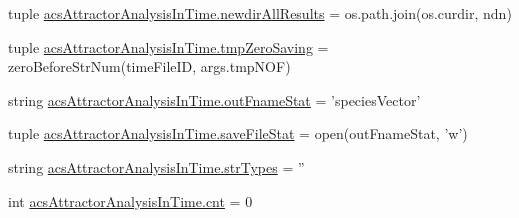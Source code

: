 \begin{DoxyCompactItemize}
tuple \hyperlink{a00125_aaf0f6fcbaaf97dcff16b62e86df0209c}{acs\+Attractor\+Analysis\+In\+Time.\+newdir\+All\+Results} = os.\+path.\+join(os.\+curdir, ndn)
\item 
tuple \hyperlink{a00125_ae86fc9dc3283934244ec28446445f722}{acs\+Attractor\+Analysis\+In\+Time.\+tmp\+Zero\+Saving} = zero\+Before\+Str\+Num(time\+File\+I\+D, args.\+tmp\+N\+O\+F)
\item 
string \hyperlink{a00125_a05e902a00f3333a303563029c80605de}{acs\+Attractor\+Analysis\+In\+Time.\+out\+Fname\+Stat} = 'species\+Vector'
\item 
tuple \hyperlink{a00125_a372b8cd0e4d3200958e9c61e3a276fb1}{acs\+Attractor\+Analysis\+In\+Time.\+save\+File\+Stat} = open(out\+Fname\+Stat, 'w')
\item 
string \hyperlink{a00125_a80aeec3ef5cc335351588c6f7c4b76cb}{acs\+Attractor\+Analysis\+In\+Time.\+str\+Types} = ''
\item 
int \hyperlink{a00125_aabada0bdbcd7fb71d37a9310d32f0a28}{acs\+Attractor\+Analysis\+In\+Time.\+cnt} = 0
\end{DoxyCompactItemize}
